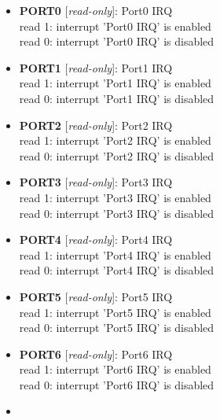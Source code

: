 \begin{itemize}
\item \begin{small}
{\bf 
PORT0
} [\emph{read-only}]: Port0 IRQ
\\
read 1: interrupt 'Port0 IRQ' is enabled\\read 0: interrupt 'Port0 IRQ' is disabled
\end{small}
\item \begin{small}
{\bf 
PORT1
} [\emph{read-only}]: Port1 IRQ
\\
read 1: interrupt 'Port1 IRQ' is enabled\\read 0: interrupt 'Port1 IRQ' is disabled
\end{small}
\item \begin{small}
{\bf 
PORT2
} [\emph{read-only}]: Port2 IRQ
\\
read 1: interrupt 'Port2 IRQ' is enabled\\read 0: interrupt 'Port2 IRQ' is disabled
\end{small}
\item \begin{small}
{\bf 
PORT3
} [\emph{read-only}]: Port3 IRQ
\\
read 1: interrupt 'Port3 IRQ' is enabled\\read 0: interrupt 'Port3 IRQ' is disabled
\end{small}
\item \begin{small}
{\bf 
PORT4
} [\emph{read-only}]: Port4 IRQ
\\
read 1: interrupt 'Port4 IRQ' is enabled\\read 0: interrupt 'Port4 IRQ' is disabled
\end{small}
\item \begin{small}
{\bf 
PORT5
} [\emph{read-only}]: Port5 IRQ
\\
read 1: interrupt 'Port5 IRQ' is enabled\\read 0: interrupt 'Port5 IRQ' is disabled
\end{small}
\item \begin{small}
{\bf 
PORT6
} [\emph{read-only}]: Port6 IRQ
\\
read 1: interrupt 'Port6 IRQ' is enabled\\read 0: interrupt 'Port6 IRQ' is disabled
\end{small}
\item \begin{small}

\end{small}
\end{itemize}
